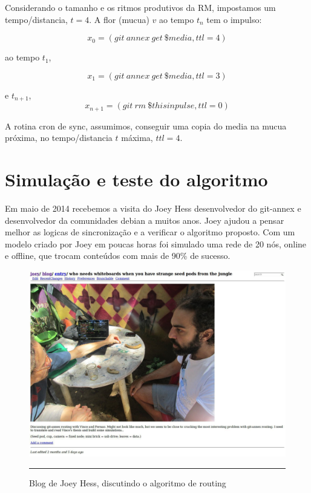 Considerando o tamanho e os ritmos produtivos da RM, impostamos um
tempo/distancia, $t=4$. A flor (mucua) $v$ ao tempo $t_{n}$ tem o
impulso:

$$
x_0 = (git \ annex \ get \ \$media, ttl=4) 
$$

ao tempo $t_{1}$,

$$
x_1 = (git \ annex \ get \ \$media, ttl=3)
$$

e $t_{n+1}$,
$$
x_{n+1} = (git \ rm  \ \$thisinpulse, ttl=0)
$$

A rotina cron de sync, assumimos, conseguir uma copia do media na
mucua próxima, no tempo/distancia $t$ máxima, $ttl=4$.


\section{Simulação e teste do algoritmo}

Em maio de 2014 recebemos a visita do Joey Hess desenvolvedor do
git-annex e desenvolvedor da comunidades debian a muitos anos. Joey
ajudou a pensar melhor as logicas de sincronização e a verificar o
algoritmo proposto. Com um modelo criado por Joey em poucas horas foi
simulado uma rede de 20 nós, online e offline, que trocam conteúdos
com mais de 90\% de sucesso.

\begin{figure}[htbp]
  \centering
  \includegraphics[width=\textwidth]{./Fig/Joey_Blog_Seeds.pdf}
  \rule{35em}{0.5pt}
  \caption[Blog de Joey Hess, discutindo o algoritmo de routing]{Blog
    de Joey Hess, discutindo o algoritmo de routing}
  \label{fig:Joey_Blog_Seeds}
\end{figure}



